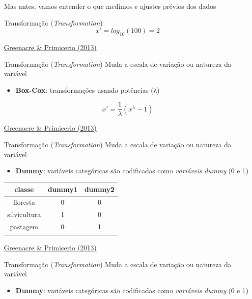 \documentclass[
  ignorenonframetext,
]{beamer}
\providecommand{\tightlist}{%
  \setlength{\itemsep}{0pt}\setlength{\parskip}{0pt}}\usepackage{longtable,booktabs,array}
\begin{document}
\begin{frame}{Mas antes, vamos entender o que medimos e ajustes prévios
dos dados}
\begin{block}{Transformação (\emph{Transformation})}
\[x' = log_{10}(100) = 2\]

\href{https://www.fbbva.es/microsite/multivariate-statistics/}{Greenacre
\& Primicerio (2013)}
\end{block}

\begin{block}{Transformação (\emph{Transformation})}
\protect\hypertarget{transformauxe7uxe3o-transformation-1}{}
Muda a escala de variação ou natureza da variável

\begin{itemize}
\tightlist
\item
  \textbf{Box-Cox}: transformações usando potências (λ)
\end{itemize}

\[x' = \frac{1}{\lambda}(x^\lambda - 1)\]

\href{https://www.fbbva.es/microsite/multivariate-statistics/}{Greenacre
\& Primicerio (2013)}
\end{block}

\begin{block}{Transformação (\emph{Transformation})}
\protect\hypertarget{transformauxe7uxe3o-transformation-2}{}
Muda a escala de variação ou natureza da variável

\begin{itemize}
\tightlist
\item
  \textbf{Dummy}: variáveis categóricas são codificadas como
  \emph{variáveis dummy} (0 e 1)
\end{itemize}

\begin{longtable}[]{@{}ccc@{}}
\toprule\noalign{}
classe & dummy1 & dummy2 \\
\midrule\noalign{}
\endhead
floresta & 0 & 0 \\
silvicultura & 1 & 0 \\
pastagem & 0 & 1 \\
\bottomrule\noalign{}
\end{longtable}

\href{https://www.fbbva.es/microsite/multivariate-statistics/}{Greenacre
\& Primicerio (2013)}
\end{block}

\begin{block}{Transformação (\emph{Transformation})}
\protect\hypertarget{transformauxe7uxe3o-transformation-3}{}
Muda a escala de variação ou natureza da variável

\begin{itemize}
\tightlist
\item
  \textbf{Dummy}: variáveis categóricas são codificadas como
  \emph{variáveis dummy} (0 e 1)
\end{itemize}


\end{block}
\end{frame}
\end{document}
